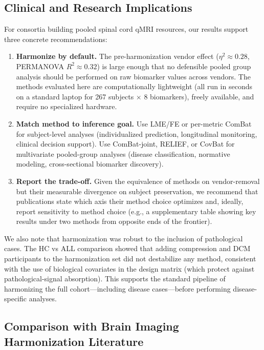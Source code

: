 \documentclass[12pt,a4paper]{article}
\begin{document}
\subsection{Clinical and Research Implications}

For consortia building pooled spinal cord qMRI resources, our results support three concrete recommendations:

\begin{enumerate}[nosep]
  \item \textbf{Harmonize by default.} The pre-harmonization vendor effect ($\eta^2 \approx 0.28$, PERMANOVA $R^2 \approx 0.32$) is large enough that no defensible pooled group analysis should be performed on raw biomarker values across vendors. The methods evaluated here are computationally lightweight (all run in seconds on a standard laptop for 267 subjects $\times$ 8 biomarkers), freely available, and require no specialized hardware.
  \item \textbf{Match method to inference goal.} Use LME/FE or per-metric ComBat for subject-level analyses (individualized prediction, longitudinal monitoring, clinical decision support). Use ComBat-joint, RELIEF, or CovBat for multivariate pooled-group analyses (disease classification, normative modeling, cross-sectional biomarker discovery).
  \item \textbf{Report the trade-off.} Given the equivalence of methods on vendor-removal but their measurable divergence on subject preservation, we recommend that publications state which axis their method choice optimizes and, ideally, report sensitivity to method choice (e.g., a supplementary table showing key results under two methods from opposite ends of the frontier).
\end{enumerate}

We also note that harmonization was robust to the inclusion of pathological cases. The HC vs ALL comparison showed that adding compression and DCM participants to the harmonization set did not destabilize any method, consistent with the use of biological covariates in the design matrix (which protect against pathological-signal absorption). This supports the standard pipeline of harmonizing the full cohort---including disease cases---before performing disease-specific analyses.

\subsection{Comparison with Brain Imaging Harmonization Literature}
\end{document}
